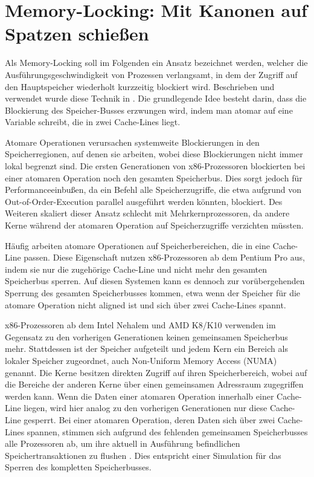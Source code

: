 \section{Memory-Locking: Mit Kanonen auf Spatzen schießen}
\label{MemoryLocking}

Als Memory-Locking soll im Folgenden ein Ansatz bezeichnet werden, welcher die Ausführungsgeschwindigkeit von Prozessen verlangsamt, in dem der Zugriff auf den Hauptspeicher wiederholt kurzzeitig blockiert wird.
Beschrieben und verwendet wurde diese Technik in \cite{MemoryLockingWu, MemoryLockingRisenpart, MemoryLockingJavaAndroid}.
Die grundlegende Idee besteht darin, dass die Blockierung des Speicher-Busses erzwungen wird, indem man atomar auf eine Variable schreibt, die in zwei Cache-Lines liegt.

Atomare Operationen verursachen systemweite Blockierungen in den Speicherregionen, auf denen sie arbeiten, wobei diese Blockierungen nicht immer lokal begrenzt sind.
Die ersten Generationen von x86-Prozessoren blockierten bei einer atomaren Operation noch den gesamten Speicherbus.
Dies sorgt jedoch für Performanceeinbußen, da ein Befehl alle Speicherzugriffe, die etwa aufgrund von Out-of-Order-Execution parallel ausgeführt werden könnten, blockiert.
Des Weiteren skaliert %
dieser Ansatz schlecht mit Mehrkernprozessoren, da andere Kerne während der atomaren Operation auf Speicherzugriffe verzichten müssten.

Häufig arbeiten atomare Operationen auf Speicherbereichen, die in eine Cache-Line passen. Diese Eigenschaft nutzen x86-Prozessoren ab dem Pentium Pro aus, indem sie nur die zugehörige Cache-Line und nicht mehr den gesamten Speicherbus sperren.
Auf diesen Systemen kann es dennoch zur vorübergehenden Sperrung des gesamten Speicherbusses kommen, etwa wenn der Speicher für die atomare Operation nicht 
aligned %
ist und sich über zwei Cache-Lines spannt.

x86-Prozessoren ab dem Intel Nehalem und AMD K8/K10 verwenden im Gegensatz zu den vorherigen Generationen keinen gemeinsamen Speicherbus mehr. Stattdessen ist der Speicher aufgeteilt und jedem Kern ein Bereich als lokaler Speicher zugeordnet, auch Non-Uniform Memory Access (NUMA) genannt. 
Die Kerne besitzen direkten Zugriff auf ihren Speicherbereich, wobei auf die Bereiche der anderen Kerne über einen gemeinsamen Adressraum zugegriffen werden kann.
Wenn die Daten einer atomaren Operation innerhalb einer Cache-Line liegen, wird hier analog zu den vorherigen Generationen nur diese Cache-Line gesperrt.
Bei einer atomaren Operation, deren Daten sich über zwei Cache-Lines spannen, stimmen sich aufgrund des fehlenden gemeinsamen Speicherbusses alle Prozessoren ab, um ihre aktuell in Ausführung befindlichen Speichertransaktionen zu flushen \cite{MemoryLockingWu}.
Dies entspricht einer Simulation für das Sperren des kompletten Speicherbusses.

